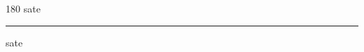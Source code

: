 
\begin{frame}
\begin{center}
\begin{turn}{180}
{\fontsize{2.5cm}{1em}\selectfont sate}
\end{turn}
\vspace{1em}\par  
\hrule
\vspace{1em}\par  
{\fontsize{2.5cm}{1em}\selectfont sate}
\end{center}
\end{frame}
